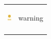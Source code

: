 \documentclass[11pt]{article}
\begin{document}
\begin{center}
\begin{tabular}{ll}
\begin{center}
\includegraphics[width=.9\linewidth]{img/dot-warning.png}
\end{center} & warning\\
\begin{center}

\end{center}
\end{tabular}
\end{center}
\end{document}
